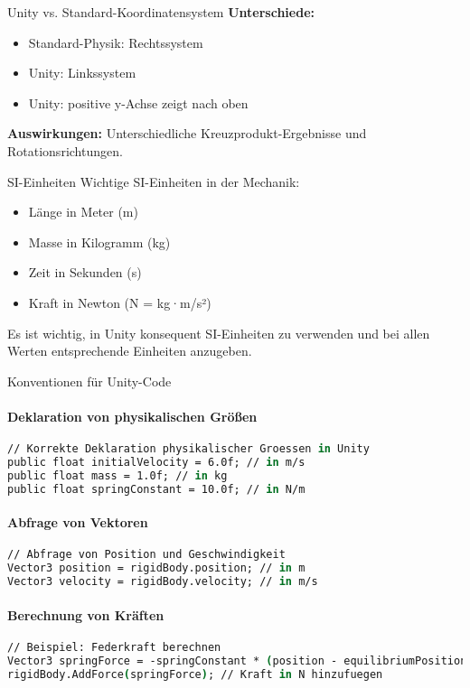 \begin{example2}{Unity vs. Standard-Koordinatensystem}
    \textbf{Unterschiede:}
    \begin{itemize}
        \item Standard-Physik: Rechtssystem
        \item Unity: Linkssystem
        \item Unity: positive y-Achse zeigt nach oben
    \end{itemize}
    
    \textbf{Auswirkungen:} Unterschiedliche Kreuzprodukt-Ergebnisse und Rotationsrichtungen.
\end{example2}

\begin{definition}{SI-Einheiten}
    Wichtige SI-Einheiten in der Mechanik:
    \begin{itemize}
        \item Länge in Meter (m)
        \item Masse in Kilogramm (kg)
        \item Zeit in Sekunden (s)
        \item Kraft in Newton (N = kg·m/s²)
    \end{itemize}
    Es ist wichtig, in Unity konsequent SI-Einheiten zu verwenden und bei allen Werten entsprechende Einheiten anzugeben.
\end{definition}

\begin{KR}{Konventionen für Unity-Code}
    \paragraph{Deklaration von physikalischen Größen}
    \begin{lstlisting}[language=csh, style=basesmol]
// Korrekte Deklaration physikalischer Groessen in Unity
public float initialVelocity = 6.0f; // in m/s
public float mass = 1.0f; // in kg
public float springConstant = 10.0f; // in N/m
    \end{lstlisting}
    
    \paragraph{Abfrage von Vektoren}
    \begin{lstlisting}[language=csh, style=basesmol]
// Abfrage von Position und Geschwindigkeit
Vector3 position = rigidBody.position; // in m
Vector3 velocity = rigidBody.velocity; // in m/s
    \end{lstlisting}
    
    \paragraph{Berechnung von Kräften}
    \begin{lstlisting}[language=csh, style=basesmol]
// Beispiel: Federkraft berechnen
Vector3 springForce = -springConstant * (position - equilibriumPosition);
rigidBody.AddForce(springForce); // Kraft in N hinzufuegen
    \end{lstlisting}
\end{KR}

